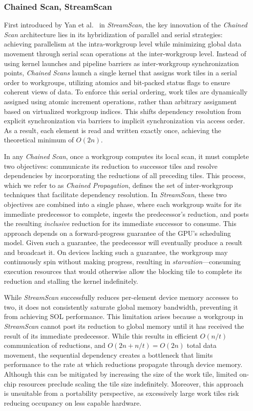 \documentclass[acmsmall, manuscript, screen, review, anonymous]{acmart}
\begin{document}
\subsubsection{Chained Scan, StreamScan}
First introduced by Yan et al.~\cite{10.1145/2442516.2442539} in \emph{StreamScan}, the key innovation of the \emph{Chained Scan} architecture lies in its hybridization of parallel and serial strategies: achieving parallelism at the intra-workgroup level while minimizing global data movement through serial scan operations at the inter-workgroup level. Instead of using kernel launches and pipeline barriers as inter-workgroup synchronization points, \emph{Chained Scans} launch a single kernel that assigns work tiles in a serial order to workgroups, utilizing atomics and bit-packed status flags to ensure coherent views of data. To enforce this serial ordering, work tiles are dynamically assigned using atomic increment operations, rather than arbitrary assignment based on virtualized workgroup indices. This shifts dependency resolution from explicit synchronization via barriers to implicit synchronization via access order. As a result, each element is read and written exactly once, achieving the theoretical minimum of $O(2n)$.

In any \emph{Chained Scan}, once a workgroup computes its local scan, it must complete two objectives: communicate its reduction to successor tiles and resolve dependencies by incorporating the reductions of all preceding tiles. This process, which we refer to as \emph{Chained Propagation}, defines the set of inter-workgroup techniques that facilitate dependency resolution. In \emph{StreamScan}, these two objectives are combined into a single phase, where each workgroup waits for its immediate predecessor to complete, ingests the predecessor's reduction, and posts the resulting \emph{inclusive} reduction for its immediate successor to consume. This approach depends on a forward-progress guarantee of the GPU's scheduling model. Given such a guarantee, the predecessor will eventually produce a result and broadcast it. On devices lacking such a guarantee, the workgroup may continuously spin without making progress, resulting in \emph{starvation}---consuming execution resources that would otherwise allow the blocking tile to complete its reduction and stalling the kernel indefinitely.

While \emph{StreamScan} successfully reduces per-element device memory accesses to two, it does not consistently saturate global memory bandwidth, preventing it from achieving SOL performance. This limitation arises because a workgroup in \emph{StreamScan} cannot post its reduction to global memory until it has received the result of its immediate predecessor. While this results in efficient $O(n/t)$ communication of reductions, and $O(2n+ n/t)= O(2n)$ total data movement, the sequential dependency creates a bottleneck that limits performance to the rate at which reductions propagate through device memory. Although this can be mitigated by increasing the size of the work tile, limited on-chip resources preclude scaling the tile size indefinitely. Moreover, this approach is unsuitable from a portability perspective, as excessively large work tiles risk reducing occupancy on less capable hardware.
\end{document}
